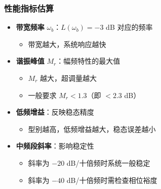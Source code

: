 \subsubsection{性能指标估算}
\begin{itemize}
    \item \textbf{带宽频率} $\omega_b$：$L(\omega_b) = -3$ dB 对应的频率
    \begin{itemize}
        \item 带宽越大，系统响应越快
    \end{itemize}
    \item \textbf{谐振峰值} $M_r$：幅频特性的最大值
    \begin{itemize}
        \item $M_r$ 越大，超调量越大
        \item 一般要求 $M_r < 1.3$（即 $< 2.3$ dB）
    \end{itemize}
    \item \textbf{低频增益}：反映稳态精度
    \begin{itemize}
        \item 型别越高，低频增益越大，稳态误差越小
    \end{itemize}
    \item \textbf{中频段斜率}：影响稳定性
    \begin{itemize}
        \item 斜率为 $-20$ dB/十倍频时系统一般稳定
        \item 斜率为 $-40$ dB/十倍频时需检查相位裕度
    \end{itemize}
\end{itemize}
